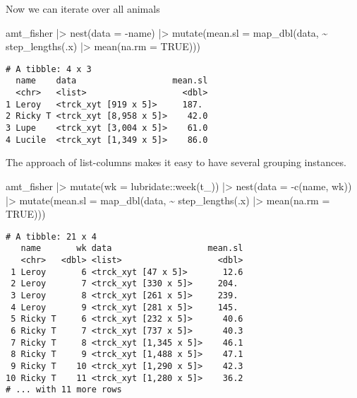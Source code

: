 \documentclass[ignorenonframetext,,t]{beamer}
\newenvironment{Shaded}{\begin{snugshade}}{\end{snugshade}}
\newcommand{\AttributeTok}[1]{\textcolor[rgb]{0.77,0.63,0.00}{#1}}
\newcommand{\ConstantTok}[1]{\textcolor[rgb]{0.00,0.00,0.00}{#1}}
\newcommand{\FunctionTok}[1]{\textcolor[rgb]{0.00,0.00,0.00}{#1}}
\newcommand{\NormalTok}[1]{#1}
\newcommand{\SpecialCharTok}[1]{\textcolor[rgb]{0.00,0.00,0.00}{#1}}
\begin{document}
\begin{frame}[fragile]
Now we can iterate over all animals

\begin{Shaded}
\begin{Highlighting}[]
\NormalTok{amt\_fisher }\SpecialCharTok{|\textgreater{}} \FunctionTok{nest}\NormalTok{(}\AttributeTok{data =} \SpecialCharTok{{-}}\NormalTok{name) }\SpecialCharTok{|\textgreater{}} 
  \FunctionTok{mutate}\NormalTok{(}\AttributeTok{mean.sl =} \FunctionTok{map\_dbl}\NormalTok{(data, }\SpecialCharTok{\textasciitilde{}} \FunctionTok{step\_lengths}\NormalTok{(.x) }\SpecialCharTok{|\textgreater{}} 
                             \FunctionTok{mean}\NormalTok{(}\AttributeTok{na.rm =} \ConstantTok{TRUE}\NormalTok{)))}
\end{Highlighting}
\end{Shaded}

\begin{verbatim}
# A tibble: 4 x 3
  name    data                   mean.sl
  <chr>   <list>                   <dbl>
1 Leroy   <trck_xyt [919 x 5]>     187. 
2 Ricky T <trck_xyt [8,958 x 5]>    42.0
3 Lupe    <trck_xyt [3,004 x 5]>    61.0
4 Lucile  <trck_xyt [1,349 x 5]>    86.0
\end{verbatim}
\end{frame}

\begin{frame}[fragile]
The approach of list-columns makes it easy to have several grouping
instances.

\begin{Shaded}
\begin{Highlighting}[]
\NormalTok{amt\_fisher }\SpecialCharTok{|\textgreater{}} \FunctionTok{mutate}\NormalTok{(}\AttributeTok{wk =}\NormalTok{ lubridate}\SpecialCharTok{::}\FunctionTok{week}\NormalTok{(t\_)) }\SpecialCharTok{|\textgreater{}} 
  \FunctionTok{nest}\NormalTok{(}\AttributeTok{data =} \SpecialCharTok{{-}}\FunctionTok{c}\NormalTok{(name, wk)) }\SpecialCharTok{|\textgreater{}} 
  \FunctionTok{mutate}\NormalTok{(}\AttributeTok{mean.sl =} \FunctionTok{map\_dbl}\NormalTok{(data, }\SpecialCharTok{\textasciitilde{}} \FunctionTok{step\_lengths}\NormalTok{(.x) }\SpecialCharTok{|\textgreater{}} 
                             \FunctionTok{mean}\NormalTok{(}\AttributeTok{na.rm =} \ConstantTok{TRUE}\NormalTok{)))}
\end{Highlighting}
\end{Shaded}

\begin{verbatim}
# A tibble: 21 x 4
   name       wk data                   mean.sl
   <chr>   <dbl> <list>                   <dbl>
 1 Leroy       6 <trck_xyt [47 x 5]>       12.6
 2 Leroy       7 <trck_xyt [330 x 5]>     204. 
 3 Leroy       8 <trck_xyt [261 x 5]>     239. 
 4 Leroy       9 <trck_xyt [281 x 5]>     145. 
 5 Ricky T     6 <trck_xyt [232 x 5]>      40.6
 6 Ricky T     7 <trck_xyt [737 x 5]>      40.3
 7 Ricky T     8 <trck_xyt [1,345 x 5]>    46.1
 8 Ricky T     9 <trck_xyt [1,488 x 5]>    47.1
 9 Ricky T    10 <trck_xyt [1,290 x 5]>    42.3
10 Ricky T    11 <trck_xyt [1,280 x 5]>    36.2
# ... with 11 more rows
\end{verbatim}
\end{frame}
\end{document}
